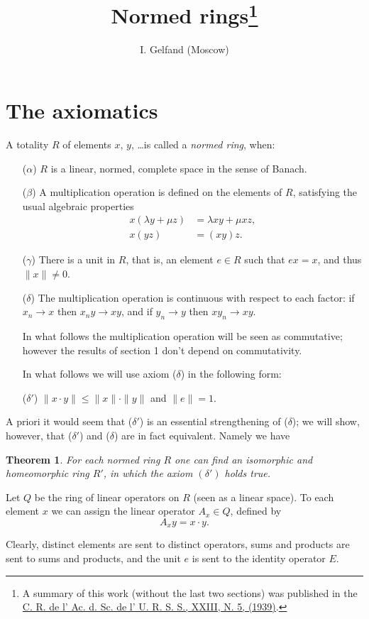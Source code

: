 \documentclass{article}
\title{Normed rings\footnote{A summary of this work (without the last two sections) was published in the \href{https://books.google.se/books/about/Comptes_rendus_de_l_Acad\%C3\%A9mie_des_scienc.html?id=wIkIAAAAIAAJ}{C. R. de l' Ac. d. Sc. de l' U. R. S. S., XXIII, N. 5, (1939)}.}}
\author{I. Gelfand (Moscow)}
\date{}%
\newtheorem{theorem}{Theorem}
\theoremstyle{definition}
\begin{document}
\maketitle

\section{The axiomatics}
A totality $R$ of elements $x$, $y$, \dots is called a \emph{normed ring}, when:
\begin{enumerate}
\item [($\alpha$)] $R$ is a linear, normed, complete space in the sense of Banach.
\item [($\beta$)] A multiplication operation is defined on the elements of $R$, satisfying the usual algebraic properties
  \begin{align*}
    x(\lambda y + \mu z) &= \lambda xy + \mu xz,\\
    x(yz) &= (xy)z.
  \end{align*}
\item [($\gamma$)] There is a unit in $R$, that is, an element $e\in R$ such that $ex=x$, and thus $\| x \| \neq 0$.
\item [($\delta$)]
  The multiplication operation is continuous with respect to each factor: if $x_n \to x$ then $x_n y \to xy$, and if $y_n \to y$ then $xy_n \to xy$.
  
  In what follows the multiplication operation will be seen as commutative; however the results of section 1 don't depend on commutativity.

  In what follows we will use axiom ($\delta$) in the following form:
\item [($\delta'$)] $\|x\cdot y\| \leq \|x\|\cdot\|y\|$ and $\|e\| = 1$.
\end{enumerate}
A priori it would seem that ($\delta'$) is an essential strengthening of ($\delta$); we will show, however, that ($\delta'$) and ($\delta$) are in fact equivalent. Namely we have
\begin{theorem}
  For each normed ring $R$ one can find an isomorphic and homeomorphic ring $R'$, in which the axiom $(\delta')$ holds true.
\end{theorem}
Let $Q$ be the ring of linear operators on $R$ (seen as a linear space). To each element $x$ we can assign the linear operator $A_x\in Q$, defined by
$$A_x y = x\cdot y.$$

Clearly, distinct elements are sent to distinct operators, sums and products are sent to sums and products, and the unit $e$ is sent to the identity operator $E$.
\end{document}

